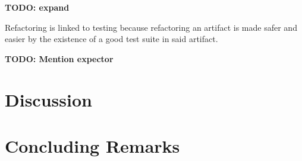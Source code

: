\documentclass[10pt,conference,compsocconf]{IEEEtran}
\newcommand{\todo}[1]{\textbf{TODO: #1}}
\begin{document}
\todo{expand}

Refactoring is linked to testing because refactoring an artifact is made safer and easier by the existence of a good test suite in said artifact.

\todo{Mention expector}

\section{Discussion}
\label{sec:discussion}


\section{Concluding Remarks}
\label{sec:conclusions}

\newpage
\balance





\end{document}
